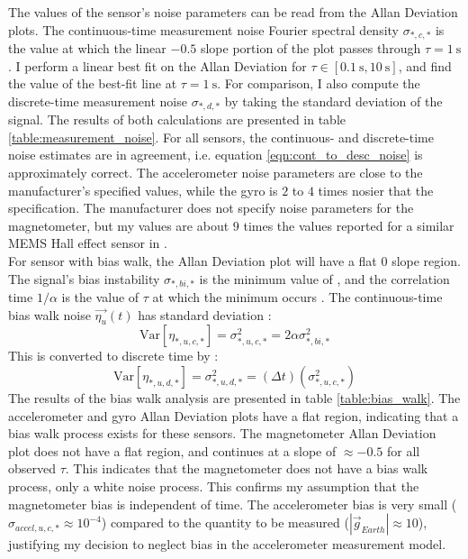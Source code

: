 \documentclass[conference]{IEEEtran}
\newcommand{\Var}{\mathrm{Var}}
\begin{document}
The values of the sensor's noise parameters can be read from the Allan Deviation plots. The continuous-time measurement noise Fourier spectral density $\sigma_{*,c,*}$ is the value at which the linear $-0.5$ slope portion of the plot passes through $\tau = \SI{1}{\second}$ \cite{UCAM-CL-TR-696}. I perform a linear best fit on the Allan Deviation for $\tau \in [\SI{0.1}{\second}, \SI{10}{\second}]$, and find the value of the best-fit line at $\tau = \SI{1}{\second}$. For comparison, I also compute the discrete-time measurement noise $\sigma_{*,d,*}$ by taking the standard deviation of the signal. The results of both calculations are presented in table \ref{table:measurement_noise}. For all sensors, the continuous- and discrete-time noise estimates are in agreement, i.e. equation \ref{eqn:cont_to_desc_noise} is approximately correct. The accelerometer noise parameters are close to the manufacturer's specified values, while the gyro is $2$ to $4$ times nosier that the specification. The manufacturer does not specify noise parameters for the magnetometer, but my values are about $9$ times the values reported for a similar MEMS Hall effect sensor in \cite{1643403}.\\

For sensor with bias walk, the Allan Deviation plot will have a flat $0$ slope region. The signal's bias instability $\sigma_{*,bi,*}$ is the minimum value of , and the correlation time $1/\alpha$ is the value of $\tau$ at which the minimum occurs \cite{UCAM-CL-TR-696}. The continuous-time bias walk noise $\vec{\eta_u}(t)$ has standard deviation \cite{1642588}:
\begin{equation}
    \Var[\eta_{*,u,c,*}] = \sigma_{*,u,c,*}^2 = 2 \alpha \sigma_{*,bi,*}^2
\end{equation}
This is converted to discrete time by \cite{1642588}:
\begin{equation}
    \Var[\eta_{*,u,d,*}] = \sigma_{*,u,d,*}^2 = (\Delta t) (\sigma_{*,u,c,*}^2)
\end{equation}
The results of the bias walk analysis are presented in table \ref{table:bias_walk}. The accelerometer and gyro Allan Deviation plots have a flat region, indicating that a bias walk process exists for these sensors. The magnetometer Allan Deviation plot does not have a flat region, and continues at a slope of $\approx -0.5$ for all observed $\tau$. This indicates that the magnetometer does not have a bias walk process, only a white noise process. This confirms my assumption that the magnetometer bias is independent of time. The accelerometer bias is very small ($\sigma_{accel,u,c,*} \approx 10^{-4}$) compared to the quantity to be measured ($|\vec{g}_{Earth}| \approx 10$), justifying my decision to neglect bias in the accelerometer measurement model.
\end{document}
